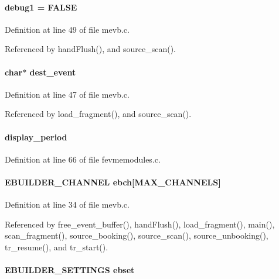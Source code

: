 \paragraph[{debug1}]{ {\bf debug1} = FALSE}\hfill\label{mevb_8c_a82520b043965043ff385537ae610c8ad}


Definition at line 49 of file mevb.c.

Referenced by handFlush(), and source\_\-scan().
\paragraph[{dest\_\-event}]{\setlength{\rightskip}{0pt plus 5cm}char$\ast$ {\bf dest\_\-event}}\hfill\label{mevb_8c_abcf1b50608e9f6963bcec52b95e1cc8c}


Definition at line 47 of file mevb.c.

Referenced by load\_\-fragment(), and source\_\-scan().
\paragraph[{display\_\-period}]{ {\bf display\_\-period}}\hfill\label{mevb_8c_ab9cdcefda91459091b0ed33011d0d18c}


Definition at line 66 of file fevmemodules.c.
\paragraph[{ebch}]{\setlength{\rightskip}{0pt plus 5cm}EBUILDER\_\-CHANNEL {\bf ebch}\mbox{[}MAX\_\-CHANNELS\mbox{]}}\hfill\label{mevb_8c_a20754034bec49b7ee4e69ef89078443f}


Definition at line 34 of file mevb.c.

Referenced by free\_\-event\_\-buffer(), handFlush(), load\_\-fragment(), main(), scan\_\-fragment(), source\_\-booking(), source\_\-scan(), source\_\-unbooking(), tr\_\-resume(), and tr\_\-start().
\paragraph[{ebset}]{\setlength{\rightskip}{0pt plus 5cm}EBUILDER\_\-SETTINGS {\bf ebset}}\hfill\label{mevb_8c_a70fcf09808475481c64facd46bd95dfc}


